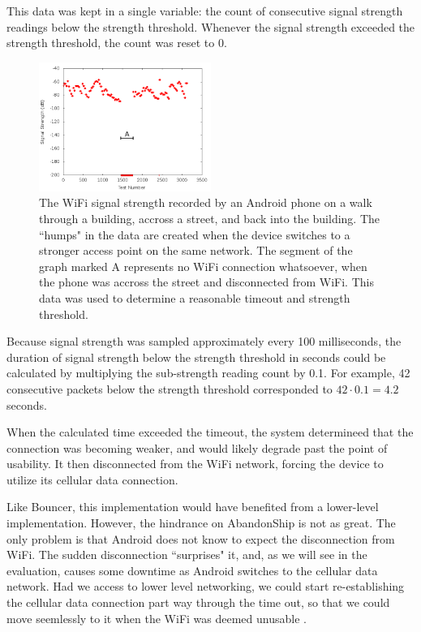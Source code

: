 This data was kept in a single variable: the count of consecutive signal strength readings below the strength threshold. Whenever the signal strength exceeded the strength threshold, the count was reset to 0.

\begin{figure}
	\includegraphics[width=0.5\textwidth]{sigStrength}
	\caption{The WiFi signal strength recorded by an Android phone on a walk through a building, accross a street, and back into the building. The ``humps" in the data are created when the device switches to a stronger access point on the same network. The segment of the graph marked A represents no WiFi connection whatsoever, when the phone was accross the street and disconnected from WiFi. This data was used to determine a reasonable timeout and strength threshold.}
\end{figure}

Because signal strength was sampled approximately every 100 milliseconds, the duration of signal strength below the strength threshold in seconds could be calculated by multiplying the sub-strength reading count by 0.1. For example, 42 consecutive packets below the strength threshold corresponded to $ 42 \cdot 0.1 = 4.2 $ seconds.

When the calculated time exceeded the timeout, the system determineed that the connection was becoming weaker, and would likely degrade past the point of usability. It then disconnected from the WiFi network, forcing the device to utilize its cellular data connection.

Like Bouncer, this implementation would have benefited from a lower-level implementation. However, the hindrance on AbandonShip is not as great. The only problem is that Android does not know to expect the disconnection from WiFi. The sudden disconnection ``surprises" it, and, as we will see in the evaluation, causes some downtime as Android switches to the cellular data network. Had we access to lower level networking, we could start re-establishing the cellular data connection part way through the time out, so that we could move seemlessly to it when the WiFi was deemed unusable
.